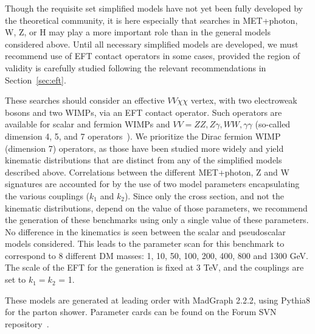 \documentclass[a4,debug,notitlepage,nobib]{tufte-handout}
\begin{document}
Though the requisite set simplified models have not yet been fully
developed by the theoretical community, it is here especially that
searches in MET+photon, W, Z, or H may play a more important role than
in the general models considered above. Until all necessary simplified models
are developed, we must recommend use of EFT contact operators
in some cases, provided the region of validity is carefully studied
following the relevant recommendations in Section~\ref{sec:eft}.



These searches should consider an
effective $VV\chi\chi$ vertex, with two electroweak bosons and two WIMPs,
via an EFT contact operator. Such operators are available for scalar
and fermion WIMPs and $VV=ZZ,Z \gamma,WW,\gamma \gamma$ (so-called
dimension 4, 5, and 7 operators~\cite{Carpenter:2012rg,
Crivellin:2015wva}). We prioritize the Dirac fermion WIMP (dimension
7) operators, as those have been studied more widely and yield
kinematic distributions that are distinct from any of the simplified
models described above.  Correlations between the different
MET+photon, Z and W signatures are accounted for by the use of two
model parameters encapsulating the various couplings ($k_1$ and $k_2$). 
Since only the cross section, and not the kinematic
distributions, depend on the value of those parameters, we recommend
the generation of these benchmarks using only a single value of these
parameters. No difference in the kinematics is seen between the scalar
and pseudoscalar models considered.  This leads to the parameter scan
for this benchmark to correspond to 8 different DM masses: 
1, 10, 50, 100, 200, 400, 800 and 1300 GeV. The scale of the EFT
for the generation is fixed at 3 TeV, and the couplings are
set to $k_1 = k_2$ = 1. 

These models are generated at leading
order with MadGraph 2.2.2, using Pythia8 for the parton shower.
Parameter cards can be found on the Forum SVN repository~\cite{ForumSVN_EWEFTD7}.
\end{document}
